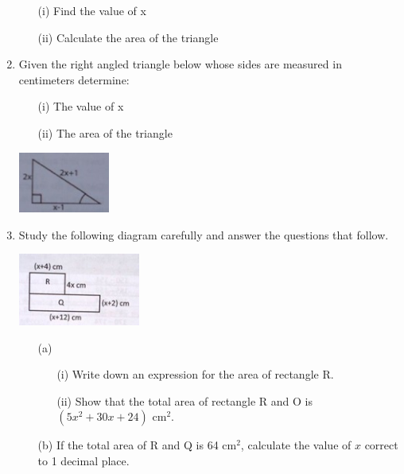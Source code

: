 \begin{enumerate}
	\begin{itemize}
	\item[(i)] Find the value of x
	\item[(ii)] Calculate the area of the triangle
	\end{itemize}		
	
	\item Given the right angled triangle below whose sides are measured in centimeters determine:
		\begin{itemize}
		\item[(i)] The value of x
		\item[(ii)] The area of the triangle
		\end{itemize}
		
		\begin{center}
		\includegraphics[width=3cm]{./img/quad2.jpg}
		\end{center}
		
	\item Study the following diagram carefully and answer the questions that follow.
	\begin{center}
	\includegraphics[width=4cm]{./img/quad3.jpg}
	\end{center}	
	
		\begin{itemize}
		\item[(a)]
			\begin{itemize}
			\item[(i)] Write down an expression for the area of rectangle R.
			\item[(ii)] Show that the total area of rectangle R and O is $(5x^2 + 30x + 24)$ cm$^2$.
			\end{itemize}					
		\item[(b)] If the total area of R and Q is 64 cm$^2$, calculate the value of $x$ correct to 1 decimal place.			
		\end{itemize}			

\end{enumerate}
	
